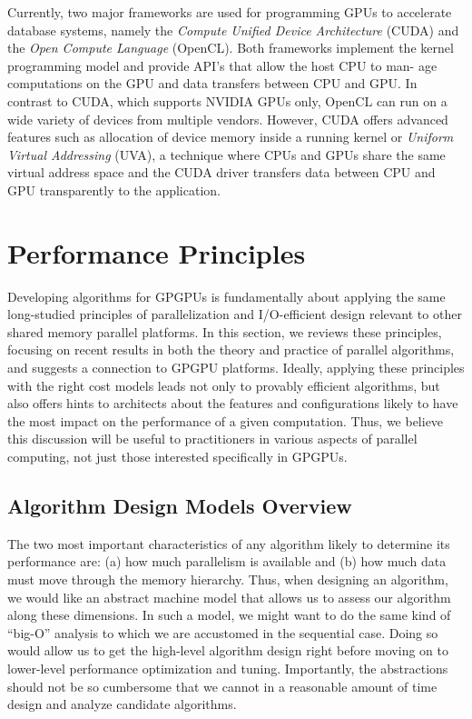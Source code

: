 \documentclass[twocolumn]{article}
\begin{document}
Currently, two major frameworks are used for programming GPUs to accelerate database systems, namely the \textit{Compute Unified Device Architecture} (CUDA) and the \textit{Open Compute Language} (OpenCL). Both frameworks implement the kernel programming model and provide API’s that allow the host CPU to man- age computations on the GPU and data transfers between CPU and GPU. In contrast to CUDA, which supports NVIDIA GPUs only, OpenCL can run on a wide variety of devices from multiple vendors.
However, CUDA offers advanced features such as allocation of device memory inside a running kernel or \textit{Uniform Virtual Addressing} (UVA), a technique where CPUs and GPUs share the same virtual address space and the CUDA driver transfers data between CPU and GPU transparently to the application.

\section{Performance Principles}
Developing algorithms for GPGPUs is fundamentally about applying the same long-studied principles of parallelization and I/O-efficient design relevant to other shared memory parallel platforms. 
In this section, we reviews these principles, focusing on recent results in both the theory and practice of parallel algorithms, and suggests a connection to GPGPU platforms. Ideally, applying these principles with the right cost models leads not only to provably efficient algorithms, but also offers hints to architects about the features and configurations likely to have the most impact on the performance of a given computation. Thus, we believe this discussion will be useful to practitioners in various aspects of parallel computing, not just those interested specifically in GPGPUs.

\subsection{Algorithm Design Models Overview}
The two most important characteristics of any algorithm likely to determine its performance are: (a) how much parallelism is available and (b) how much data must move through the memory hierarchy. Thus, when designing an algorithm, we would like an abstract machine model that allows us to assess our algorithm along these dimensions. In such a model, we might want to do the same kind of “big-O” analysis to which we are accustomed in the sequential case. Doing so would allow us to get the high-level algorithm design right before moving on to lower-level performance optimization and tuning. Importantly, the abstractions should not be so cumbersome that we cannot in a reasonable amount of time design and analyze candidate algorithms.
\end{document}
